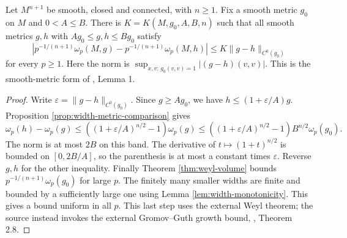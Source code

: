 \begin{theorem}\label{thm:normalized-width-lipschitz}
Let $M^{n+1}$ be smooth, closed and connected, with $n\geq1$. Fix a smooth metric $g_0$ on $M$ and $0<A\leq B$. There is $K=K(M,g_0,A,B,n)$ such that all smooth metrics $g,h$ with $Ag_0\leq g,h\leq Bg_0$ satisfy
\[
 \left|p^{-1/(n+1)}\omega_p(M,g)-p^{-1/(n+1)}\omega_p(M,h)\right|
 \leq K\|g-h\|_{C^0(g_0)}
\]
for every $p\geq1$. Here the norm is $\sup_{x,v:\,g_0(v,v)=1}|(g-h)(v,v)|$. This is the smooth-metric form of \cite{MNS19}, Lemma 1.
\end{theorem}
\begin{proof}
Write $\varepsilon=\|g-h\|_{C^0(g_0)}$. Since $g\geq Ag_0$, we have $h\leq(1+\varepsilon/A)g$. Proposition \ref{prop:width-metric-comparison} gives
\[
 \omega_p(h)-\omega_p(g)
 \leq\left((1+\varepsilon/A)^{n/2}-1\right)\omega_p(g)
 \leq\left((1+\varepsilon/A)^{n/2}-1\right)B^{n/2}\omega_p(g_0).
\]
The norm is at most $2B$ on this band. The derivative of $t\mapsto(1+t)^{n/2}$ is bounded on $[0,2B/A]$, so the parenthesis is at most a constant times $\varepsilon$. Reverse $g,h$ for the other inequality. Finally Theorem \ref{thm:weyl-volume} bounds $p^{-1/(n+1)}\omega_p(g_0)$ for large $p$. The finitely many smaller widths are finite and bounded by a sufficiently large one using Lemma \ref{lem:width-monotonicity}. This gives a bound uniform in all $p$. This last step uses the external Weyl theorem; the source instead invokes the external Gromov--Guth growth bound, \cite{LMN}, Theorem 2.8.
\end{proof}


